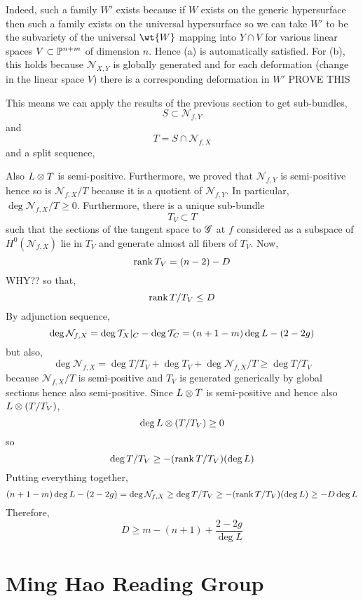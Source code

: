 \documentclass[12pt]{article}
\newcommand{\cN}{\mathcal{N}}
\begin{document}
Indeed, such a family $W'$ exists because if $W$ exists on the generic hypersurface then such a family exists on the universal hypersurface so we can take $W'$ to be the subvariety of the universal $\wt{W}$ mapping into $Y \cap V$ for various linear spaces $V \subset \P^{n+m}$ of dimension $n$. Hence (a) is automatically satisfied. For (b), this holds because $\cN_{X,Y}$ is globally generated and for each deformation (change in the linear space $V$) there is a corresponding deformation in $W'$ {\color{red} PROVE THIS}

This means we can apply the results of the previous section to get sub-bundles,
\[ S \subset \cN_{f,Y} \]
and 
\[ T = S \cap \cN_{f,X} \]
and a split sequence,
\begin{center}
\end{center}
Also $L \ot T$ is semi-positive. Furthermore, we proved that $\cN_{f,Y}$ is semi-positive hence so is $\cN_{f,X}/T$ because it is a quotient of $\cN_{f,Y}$. In particular, $\deg{\cN_{f,X}/T} \ge 0$. Furthermore, there is a unique sub-bundle 
\[ T_V \subset T \]
such that the sections of the tangent space to $\G$ at $f$ considered as a subspace of $H^0(\cN_{f,X})$ lie in $T_V$ and generate almost all fibers of $T_V$. Now,
\[ \rank{T_V} = (n-2) - D \]
{\color{red} WHY??}
so that,
\[ \rank{T / T_V} \le D \]
By adjunction sequence,
\[ \deg{\cN_{f,X}} = \deg{\T_X|_C} - \deg{\T_C} = (n+1 - m) \deg{L} - (2 - 2 g) \]
but also,
\[ \deg{\cN_{f,X}} = \deg{T/T_V} + \deg{T_V} + \deg{\cN_{f,X}/T} \ge \deg{T/T_V} \]
because $\cN_{f,X}/T$ is semi-positive and $T_V$ is generated generically by global sections hence also semi-positive. Since $L \ot T$ is semi-positive and hence also $L \ot (T/T_V)$,
\[ \deg{L \ot (T/T_V)} \ge 0 \]
so 
\[ \deg{T/T_V} \ge - (\rank{T/T_V}) (\deg{L}) \]
Putting everything together,
\[ (n+1 - m) \deg{L} - (2 - 2 g) = \deg{\cN_{f,X}} \ge \deg{T/T_V} \ge - (\rank{T/T_V}) (\deg{L}) \ge - D \deg{L} \]
Therefore,
\[ D \ge m - (n+1) + \frac{2 - 2g}{\deg{L}} \]

\section{Ming Hao Reading Group}

\newcommand{\barkap}{\bar{\kappa}}
\newcommand{\kapbar}{\bar{\kappa}}
\newcommand{\cO}{\mathcal{O}}
\end{document}
